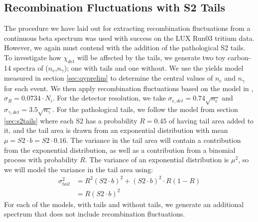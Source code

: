 \subsection{Recombination Fluctuations with S2 Tails}
The procedure we have laid out for extracting recombination fluctuations from a continuous beta spectrum was used with success on the LUX Run03 tritium data\cite{lux_tritium}. However, we again must contend with the addition of the pathological S2 tails. To investigate how $\chi_{det}$ will be affected by the tails, we generate two toy carbon-14 spectra of ($n_{e}$,$n_{\gamma}$); one with tails and one without. We use the yields model measured in section \ref{sec:qyprelim} to determine the central values of $n_e$ and $n_{\gamma}$ for each event. We then apply recombination fluctuations based on the model in \cite{lux_tritium}, $\sigma_R=0.0734\cdot N_i$. For the detector resolution, we take $\sigma_{e,det}=0.74\sqrt{n_e}$ and $\sigma_{\gamma,det}=3.5\sqrt{n_{\gamma}}$. For the pathological tails, we follow the model from section \ref{sec:s2tails} where each S2 has a probability $R=0.45$ of having tail area added to it, and the tail area is drawn from an exponential distribution with mean $\mu=S2\cdot b=S2 \cdot 0.16$. The variance in the tail area will contain a contribution from the exponential distribution, as well as a contribution from a binomial process with probability $R$. The variance of an exponential distribution is $\mu^2$, so we will model the variance in the tail area using:
\begin{equation}
\begin{split}
\sigma_{tail}^2&= R^2(S2\cdot b)^2+(S2\cdot b)^2\cdot R(1-R)\\
&=R(S2\cdot b)^2
\end{split}
\end{equation}
For each of the models, with tails and without tails, we generate an additional spectrum that does not include recombination fluctuations.
